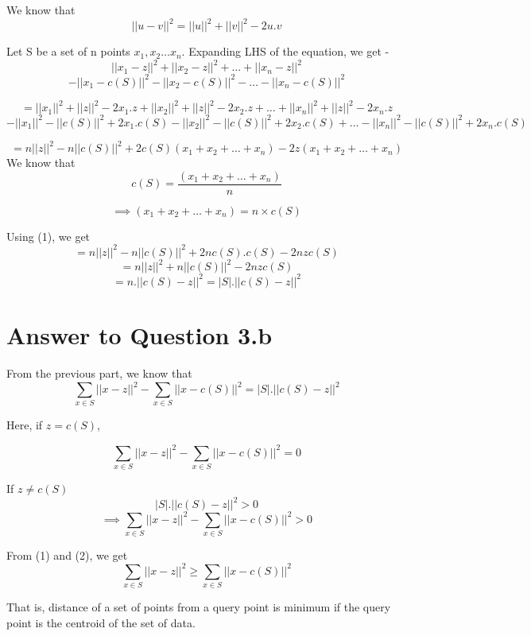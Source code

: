 \documentclass[11pt]{article}
\begin{document}
{We know that 
$$||u - v||^2 = ||u||^2 + ||v||^2 - 2u.v$$

Let S be a set of n points $x_1, x_2 \hdots x_n$. Expanding LHS of the equation, we get -
$$ || x_1 - z ||^2 + || x_2 - z ||^2 + \hdots + || x_n - z ||^2$$ 
$$- || x_1 - c(S)||^2 - || x_2 - c(S)||^2 - \hdots - || x_n - c(S)||^2$$

$$ = ||x_1||^2 + ||z||^2 - 2x_1.z + ||x_2||^2 + ||z||^2 - 2x_2.z + \hdots + ||x_n||^2 + ||z||^2 - 2x_n.z$$
$$ - ||x_1||^2 - ||c(S)||^2 + 2x_1.c(S) - ||x_2||^2 - ||c(S)||^2 + 2x_2.c(S) + \hdots - ||x_n||^2 - ||c(S)||^2 + 2x_n.c(S)$$

$$ = n ||z||^2 - n ||c(S)||^2 + 2 c(S) (x_1 + x_2 + \hdots + x_n) - 2 z (x_1 + x_2 + \hdots + x_n)$$
We know that
$$c(S) = \frac{(x_1 + x_2 + \hdots + x_n)}{n}$$

\begin{equation}
\implies  (x_1 + x_2 + \hdots + x_n) = n \times c(S)
\end{equation} 

Using (1), we get
$$ = n ||z||^2 - n ||c(S)||^2 + 2 n c(S).c(S)  - 2 n z c(S)$$
$$ = n ||z||^2 + n ||c(S)||^2 - 2 n z c(S)$$
$$ =  n . || c(S) - z ||^2 = |S| . || c(S) - z ||^2$$


\pagebreak[4]
\section*{Answer to Question 3.b}
From the previous part, we know that $$\sum_{x \in S} || x - z ||^2 - \sum_{x \in S} || x - c(S)||^2 = |S| . || c(S) - z ||^2$$

Here, if $z = c(S)$, 

\setcounter{equation}{0}
\begin{equation}\label{eq:simple}
\sum_{x \in S} || x - z ||^2 - \sum_{x \in S} || x - c(S)||^2 = 0
\end{equation}

If $z \neq c(S)$
$$|S| . || c(S) - z ||^2 > 0$$
\begin{equation}\label{eq:simple}
\implies \sum_{x \in S} || x - z ||^2 - \sum_{x \in S} || x - c(S)||^2 > 0
\end{equation}

From (1) and (2), we get
\begin{equation}\label{eq:simple}
\sum_{x \in S} || x - z ||^2 \geq \sum_{x \in S} || x - c(S)||^2 
\end{equation}

That is, distance of a set of points from a query point is minimum if the query point is the centroid of the set of data.\\

}
\end{document}
